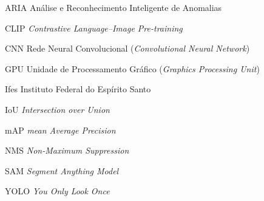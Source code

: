 \begin{siglas}
    \item[ARIA] Análise e Reconhecimento Inteligente de Anomalias
    \item[CLIP] \textit{Contrastive Language--Image Pre-training}
    \item[CNN] Rede Neural Convolucional (\textit{Convolutional Neural Network})
    \item[GPU] Unidade de Processamento Gráfico (\textit{Graphics Processing Unit})
    \item[Ifes] Instituto Federal do Espírito Santo
    \item[IoU] \textit{Intersection over Union}
    \item[mAP] \textit{mean Average Precision}
    \item[NMS] \textit{Non-Maximum Suppression}
    \item[SAM] \textit{Segment Anything Model}
    \item[YOLO] \textit{You Only Look Once}
\end{siglas}
